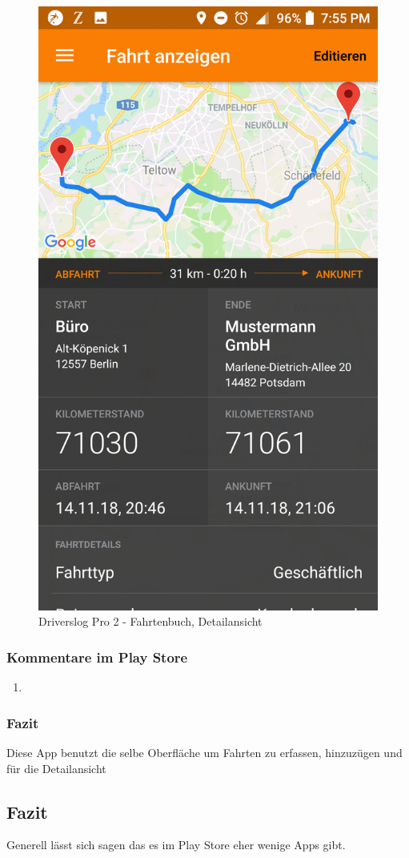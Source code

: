 \begin{figure}[H]
        \includegraphics[scale=0.14]{img/pro5}
        \caption{\label{img:img/pro5}Driverslog Pro 2 - Fahrtenbuch, Detailansicht}
\end{figure}


\subsubsection{Kommentare im Play Store}
\begin{enumerate}
    \item
\end{enumerate}

\subsubsection{Fazit}
Diese App benutzt die selbe Oberfläche um Fahrten zu erfassen, hinzuzügen und für die Detailansicht

\subsection{Fazit}
Generell lässt sich sagen das es im Play Store eher wenige Apps gibt.
